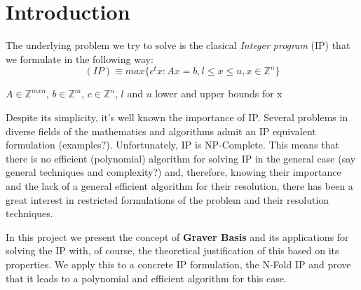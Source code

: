 \chapter{Introduction} \label{introduction}

The underlying problem we try to solve is the clasical \textit{Integer program} (IP) that we formulate in the following way:
\begin{equation*}
    (IP) \equiv max\{c^tx : Ax = b, l \leq x \leq u, x \in \mathbb{Z}^n \}
\end{equation*}
\vspace{-50pt}
\begin{center}
$A \in \mathbb{Z}^{mxn}$, $b \in \mathbb{Z}^m$, $c \in \mathbb{Z}^n$, $l$  and $u$ lower and upper bounds for x
\end{center}


Despite its simplicity, it's well known the importance of IP. Several problems in diverse fields of the mathematics and algorithms admit an IP equivalent formulation (examples?). Unfortunately, IP is NP-Complete. This means that there is no efficient (polynomial) algorithm for solving IP in the general case (say general techniques and complexity?) and, therefore, knowing their importance and the lack of a general efficient algorithm for their resolution, there has been a great interest in restricted formulations of the problem and their resolution techniques.

In this project we present the concept of \textbf{Graver Basis} and its applications for solving the IP with, of course, the theoretical justification of this based on its properties. We apply this to a concrete IP formulation, the N-Fold IP and prove that it leads to a polynomial and efficient algorithm for this case.













